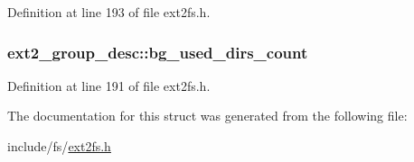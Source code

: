 \-Definition at line 193 of file ext2fs.\-h.

\hypertarget{structext2__group__desc_adc9924671cb04dd63b4b7ffff8c262dc}{
\subsubsection[{bg\-\_\-used\-\_\-dirs\-\_\-count}]{ {\bf ext2\-\_\-group\-\_\-desc\-::bg\-\_\-used\-\_\-dirs\-\_\-count}}}\label{structext2__group__desc_adc9924671cb04dd63b4b7ffff8c262dc}


\-Definition at line 191 of file ext2fs.\-h.



\-The documentation for this struct was generated from the following file\-:\begin{DoxyCompactItemize}
\item 
include/fs/\hyperlink{ext2fs_8h}{ext2fs.\-h}\end{DoxyCompactItemize}

